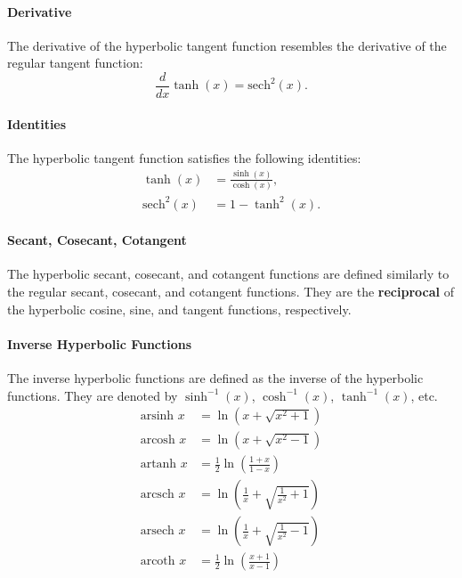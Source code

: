 \documentclass[11pt]{article}
\begin{document}
\paragraph{Derivative} The derivative of the hyperbolic tangent function resembles the derivative of the regular tangent function:
\begin{equation} \frac{d}{dx} \tanh(x) = \text{sech}^2(x). \end{equation}
\paragraph{Identities} The hyperbolic tangent function satisfies the following identities:
\begin{align}
    \tanh(x) &= \frac{\sinh(x)}{\cosh(x)}, \\
    \text{sech}^2(x) &= 1 - \tanh^2(x).
\end{align}
\paragraph{Secant, Cosecant, Cotangent} The hyperbolic secant, cosecant, and cotangent functions are defined similarly to the regular secant, cosecant, and cotangent functions. They are the \textbf{reciprocal} of the hyperbolic cosine, sine, and tangent functions, respectively.
\paragraph{Inverse Hyperbolic Functions} The inverse hyperbolic functions are defined as the inverse of the hyperbolic functions. They are denoted by $\sinh^{-1}(x)$, $\cosh^{-1}(x)$, $\tanh^{-1}(x)$, etc.
\begin{align}
    \text{arsinh } x &= \ln\left(x + \sqrt{x^2 + 1}\right) \\[10pt]
    \text{arcosh } x &= \ln\left(x + \sqrt{x^2 - 1}\right) \\[10pt]
    \text{artanh } x &= \frac{1}{2} \ln\left(\frac{1 + x}{1 - x}\right) \\[10pt]
    \text{arcsch } x &= \ln\left(\frac{1}{x} + \sqrt{\frac{1}{x^2} + 1}\right) \\[10pt]
    \text{arsech } x &= \ln\left(\frac{1}{x} + \sqrt{\frac{1}{x^2} - 1}\right) \\[10pt]
    \text{arcoth } x &= \frac{1}{2} \ln\left(\frac{x + 1}{x - 1}\right)
\end{align}
\appendix

\end{document}
